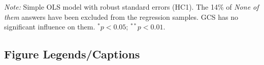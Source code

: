 \documentclass[12pt,english]{article}
\begin{document}
\begin{table}[h]
  \caption[Influence of the GCS on electoral prospects]{Preference for a progressive platform depending on whether it includes the GCS or not. (Question 28) %
} %
  \makebox[\textwidth][c]{
  }\label{tab:conjoint_c}
  {\footnotesize \textit{Note:} Simple OLS model with robust standard errors (HC1). %
  The 14\% of \textit{None of them} answers have been excluded from the regression samples. GCS has no significant influence on them. $^{*}p<0.05$; $^{**} p<0.01$. 
  }
\end{table}

\subsection*{Figure Legends/Captions}
\end{document}
